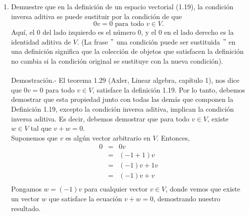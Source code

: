 \begin{enumerate}[\bfseries 1.]
    \item Demuestre que en la definición de un espacio vectorial (1.19), la condición inversa aditiva se puede sustituir por la condición de que
    $$0v=0\mbox{ para todo } v\in V.$$
    Aquí, el $0$ del lado izquierdo es el número $0$, y el $0$ en el lado derecho es la identidad aditiva de $V$. (La frase $"$ una condición puede ser sustituida $"$ en una definición significa que la colección de objetos que satisfacen la definición no cambia si la condición original se sustituye con la nueva condición).\\\\
	Demostración.-\;  El teorema 1.29 (Axler, Linear algebra, capítulo 1), nos dice que $0v=0$ para todo $v\in V$, satisface la definición 1.19. Por lo tanto, debemos demostrar que esta propiedad junto con todas las demás que componen la Definición 1.19, excepto la condición inversa aditiva, implican la condición inversa aditiva. Es decir, debemos demostrar que para todo $v\in V$, existe $w\in V$ tal que $v+w=0.$\\ 
	Suponemos que $v$ es algún vector arbitrario en $V$. Entonces,
	$$\begin{array}{rcl}
	    0 &=& 0v \\
	      &=& (-1+1)v\\
	      &=& (-1)v + 1v\\
	      &=& (-1)v + v\\
	\end{array}$$
	Pongamos $w=(-1)v$ para cualquier vector $v\in V$, donde vemos que existe un vector $w$ que satisface la ecuación $v+w=0$, demostrando nuestro resultado.\\\\



\end{enumerate}
